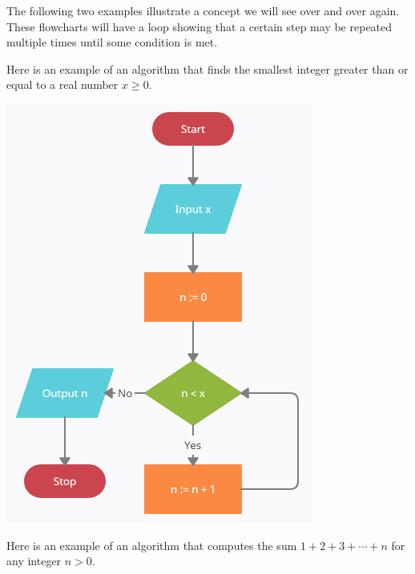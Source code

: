 \documentclass{ximera}
\begin{document}
The following two examples illustrate a concept we will see over and over again. These flowcharts will have a loop showing that a certain step may be repeated multiple times until some condition is met.

Here is an example of an algorithm that finds the smallest integer greater than or equal to a real number $x\geq 0$.

\begin{center}
	\includegraphics{ceil.png}
\end{center}

Here is an example of an algorithm that computes the sum $1+2+3+\cdots+n$ for any integer $n>0$.
\end{document}
